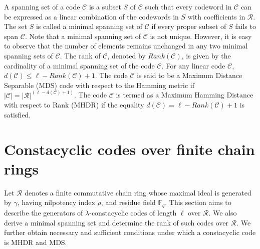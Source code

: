 \documentclass[12pt,a4paper]{article}
\begin{document}
A spanning set of a code $\mathcal{C}$ is a subset $S$ of $\mathcal{C}$ such that every codeword in $\mathcal{C}$ can be expressed as a linear combination of the codewords in $S$ with coefficients in $\mathcal{R}$. The set $S$ is called a minimal spanning set of $\mathcal{C}$ if every proper subset of $S$ fails to span $\mathcal{C}$. Note that a minimal spanning set of $\mathcal{C}$ is not unique. However, it is easy to observe that the number of elements remains unchanged in any two minimal spanning sets of $\mathcal{C}$. The rank of $\mathcal{C}$, denoted by $Rank(\mathcal{C})$, is given by the cardinality of a minimal spanning set of the code $\mathcal{C}$. For any linear code $\mathcal{C}$, $d(\mathcal{C}) \le \ell - Rank(\mathcal{C}) + 1$. The code $\mathcal{C}$ is said to be a Maximum Distance Separable (MDS) code with respect to the Hamming metric if $|\mathcal{C}| = |\mathcal{R}|^{(\ell-d(\mathcal{C})+1)}$. The code $\mathcal{C}$ is termed as a Maximum Hamming Distance with respect to Rank (MHDR) if the equality $d(\mathcal{C}) = \ell - Rank(\mathcal{C}) + 1$ is satisfied.


\section{Constacyclic codes over finite chain rings}\label{sec:structure}
Let $\mathcal{R}$ denotes a finite commutative chain ring whose maximal ideal is generated by $\gamma$, having nilpotency index $\rho$, and residue field $\mathbb{F}_q$. This section aims to describe the generators of $\lambda$-constacyclic codes of length $\ell$ over $\mathcal{R}$. We also derive a minimal spanning set and determine the rank of such codes over $\mathcal{R}$. We further obtain necessary and sufficient conditions under which a constacyclic code is MHDR and MDS.
\end{document}
